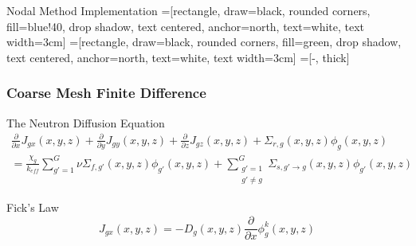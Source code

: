 \documentclass{beamer}
\begin{document}
\begin{frame}[fragile]{Nodal Method Implementation}
  =[rectangle, draw=black, rounded corners, fill=blue!40, drop shadow,
          text centered, anchor=north, text=white, text width=3cm]
  =[rectangle, draw=black, rounded corners, fill=green, drop shadow,
          text centered, anchor=north, text=white, text width=3cm]
  =[-, thick]
  \begin{figure}
\end{figure}
\end{frame}


\begin{frame}
\frametitle{Coarse Mesh Finite Difference}
\begin{block}{The Neutron Diffusion Equation}
    \begin{equation}
      \begin{split}
      \frac{\partial }{{\partial x}}J_{gx}(x,y,z) + \frac{\partial }{{\partial y}}J_{gy}(x,y,z) + \frac{\partial }{{\partial z}}J_{gz}(x,y,z) + \Sigma _{r,g}(x,y,z)\phi _g(x,y,z) \\
       = \frac{{\chi _g}}{{{k_{eff}}}}\sum\limits_{g' = 1}^G {\nu \Sigma _{f,g'}(x,y,z)\phi _{g'}(x,y,z)} + \sum_{\substack{g'=1 \\ g'\neq g}}^G {\Sigma _{s,g' \to g}(x,y,z)\phi _{g'}(x,y,z)}  \label{ndif}
     \end{split}
    \end{equation}
\end{block}
\begin{block}{Fick's Law}
  \begin{equation}
  J_{gx}(x,y,z) =  - D_g(x,y,z)\frac{\partial }{{\partial x}}\phi _g^k(x,y,z)  \label{eq:fick}
  \end{equation}
\end{block}
\end{frame}
\end{document}
